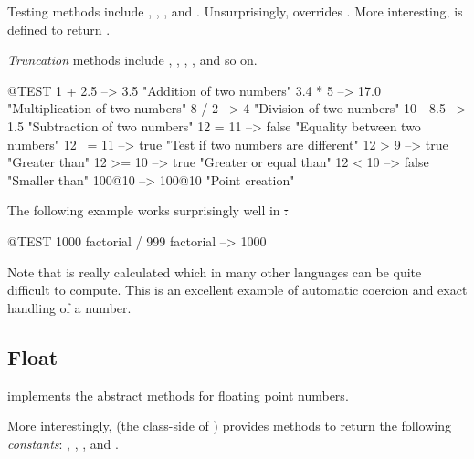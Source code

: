 \documentclass[a4paper,10pt,twoside]{book}
\begin{document}
Testing methods include , , , and .
Unsurprisingly,  overrides .
More interesting,  is defined to return .

\emph{Truncation} methods include , , , , and so on.

\begin{code}{@TEST}
1 + 2.5     --> 3.5             "Addition of two numbers"
3.4 * 5      --> 17.0           "Multiplication of two numbers"
8 / 2         --> 4                 "Division of two numbers"
10 - 8.5   --> 1.5              "Subtraction of two numbers"
12 = 11    --> false           "Equality between two numbers"
12 ~= 11 --> true            "Test if two numbers are different"
12 > 9      --> true            "Greater than"
12 >= 10  --> true            "Greater or equal  than"
12 < 10    --> false           "Smaller than"
100@10   --> 100@10    "Point creation"
\end{code}

The following example works surprisingly well in \st:
\begin{code}{@TEST}
1000 factorial / 999 factorial --> 1000
\end{code}
Note that  is really calculated which in many other languages can be quite difficult to compute.
This is an excellent example of automatic coercion and exact handling of a number.


\subsection{Float}

 implements the abstract  methods for floating point numbers.

More interestingly,  (\ie the class-side of ) provides methods to return the following \emph{constants}: , , , and .
\end{document}
